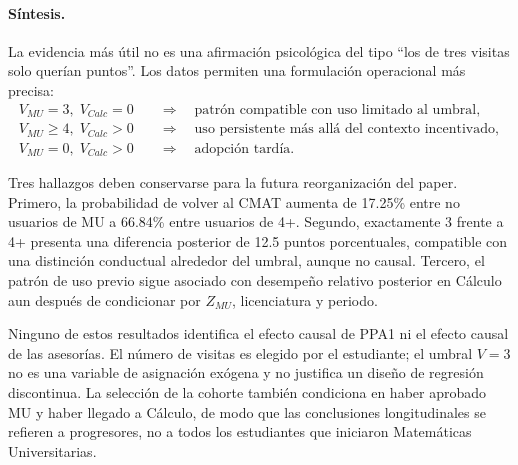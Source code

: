 \paragraph{Síntesis.}
La evidencia más útil no es una afirmación psicológica del tipo ``los de tres visitas solo querían puntos''. Los datos permiten una formulación operacional más precisa:
\[
\boxed{
\begin{aligned}
V_{MU}=3,\;V_{Calc}=0 &\quad\Rightarrow\quad \text{patrón compatible con uso limitado al umbral},\\
V_{MU}\geq4,\;V_{Calc}>0 &\quad\Rightarrow\quad \text{uso persistente más allá del contexto incentivado},\\
V_{MU}=0,\;V_{Calc}>0 &\quad\Rightarrow\quad \text{adopción tardía}.
\end{aligned}}
\]

Tres hallazgos deben conservarse para la futura reorganización del paper. Primero, la probabilidad de volver al CMAT aumenta de 17.25\% entre no usuarios de MU a 66.84\% entre usuarios de 4+. Segundo, exactamente 3 frente a 4+ presenta una diferencia posterior de 12.5 puntos porcentuales, compatible con una distinción conductual alrededor del umbral, aunque no causal. Tercero, el patrón de uso previo sigue asociado con desempeño relativo posterior en Cálculo aun después de condicionar por $Z_{MU}$, licenciatura y periodo.

\begin{cautionbox}[title=Alcance inferencial del capítulo]
Ninguno de estos resultados identifica el efecto causal de PPA1 ni el efecto causal de las asesorías. El número de visitas es elegido por el estudiante; el umbral $V=3$ no es una variable de asignación exógena y no justifica un diseño de regresión discontinua. La selección de la cohorte también condiciona en haber aprobado MU y haber llegado a Cálculo, de modo que las conclusiones longitudinales se refieren a progresores, no a todos los estudiantes que iniciaron Matemáticas Universitarias.
\end{cautionbox}
